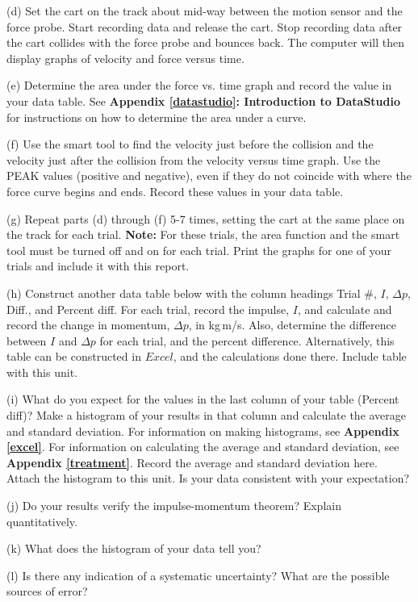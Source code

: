 (d) Set the cart on the track about mid-way between the motion sensor and the force probe. Start recording data and release the cart. Stop recording data after the cart collides with the force probe and bounces back. The computer will then display graphs of velocity and force versus time.

(e) Determine the area under the force vs. time graph and record the value in
your data table. See \textbf{Appendix \ref{datastudio}: Introduction to DataStudio} for instructions on how to determine the area under a curve.

(f) Use the smart tool to find the velocity just before the collision and the
velocity just after the collision from the velocity versus time graph. Use the 
PEAK values (positive and negative), even if they do not coincide with where 
the force curve begins and ends. Record these values in your data table.

(g) Repeat parts (d) through (f) 5-7 times, setting the cart at the same place on the track for each trial. \textbf{Note:} For these trials, the area function and the smart tool must be turned off and on for each trial. Print the graphs for one of your trials and include it with this report.

(h) Construct another data table below with the column headings
Trial \#, $I$, \( \Delta  p\), Diff., and Percent diff. For each trial, record
the impulse, $I$, and calculate and record the change in momentum, \( \Delta  p\), in kg\,m/s. Also, determine the difference between $I$ and $\Delta p$  for 
each trial, and the percent difference. Alternatively, this table can be constructed in $Excel$, and the calculations done there. Include table with this unit.
\vspace{60mm}

(i) What do you expect for the values in the last column of your table (Percent diff)? Make a histogram of your results in that column and calculate the average and standard deviation. For information on making histograms, see \textbf{Appendix \ref{excel}}. For information on calculating the average and standard deviation, see \textbf{Appendix \ref{treatment}}. Record the average and standard 
deviation here. Attach the histogram to this unit. Is your data consistent with your expectation?
\vspace{15mm}

(j) Do your results verify the impulse-momentum theorem? Explain quantitatively.
\vspace{15mm}

(k) What does the histogram of your data tell you?
\vspace{15mm}

(l) Is there any indication of a systematic uncertainty? What are the possible
sources of error?

